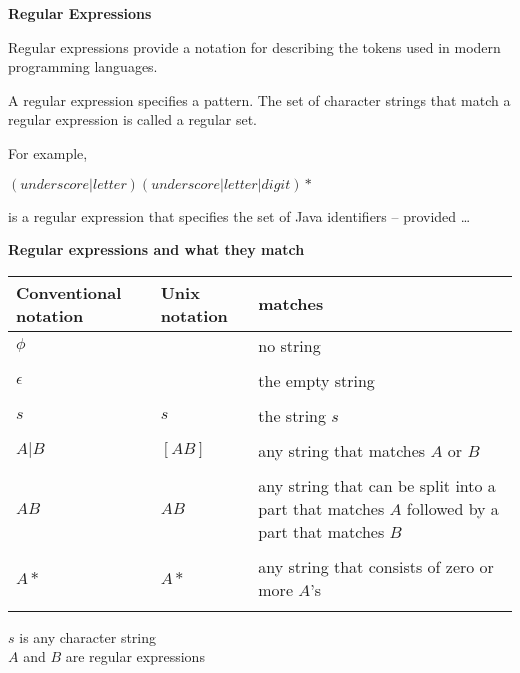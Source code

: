 \setcounter{slide}{22}
%
%
\begin{slide}{}
{\bf Regular Expressions}

Regular expressions provide a notation for describing
the tokens used in modern programming languages.

A regular expression specifies a pattern.  The set of
character strings that match a regular expression is
called a regular set.

For example,

    $ (underscore|letter)(underscore|letter|digit)* $

is a regular expression that specifies the set of
Java identifiers -- provided \ldots

\end{slide}
%
%
\begin{slide}{}
{\small
{\bf Regular expressions and what they match}

\begin{tabular}{|p{4.5cm}|p{3cm}|p{6cm}|}
\hline
Conventional notation & Unix notation & matches \\
\hline
\hline
$\phi$ & & no string \\
&&\\
\hline
$\epsilon$ & & the empty string \\
&&\\
\hline
$s$ & $s$ & the string $s$ \\
&&\\
\hline
$A|B$ & $[AB]$ & any string that matches $A$ or $B$ \\
&&\\
\hline
$AB$ & $AB$ & any string that can be split into a part that matches $A$ followed by a part that matches $B$\\
&&\\
\hline
$A*$ & $A*$& any string that consists of zero or more $A$'s \\
&&\\
\hline
\end{tabular}

$s$ is any character string\\
$A$ and $B$ are regular expressions
}
\end{slide}

